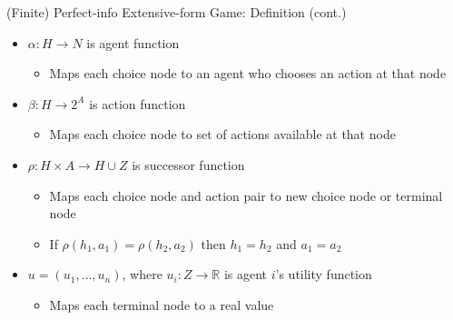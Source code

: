\documentclass[11pt,aspectratio=169,handout]{beamer}
\begin{document}
  
  \begin{frame}{(Finite) Perfect-info Extensive-form Game: Definition (cont.)}
   \begin{itemize}[<+->]
   \setlength{\itemsep}{1em}
    \item $\alpha : H \rightarrow N$ is \alert{agent function}
    \begin{itemize}[<.->]
     \item Maps each choice node to an agent who chooses an action at that node
    \end{itemize}
    \item $\beta : H \rightarrow 2^{A}$ is \alert{action function}
    \begin{itemize}[<.->]
     \item Maps each choice node to set of actions available at that node
    \end{itemize}
    \item $\rho: H \times A \rightarrow H \cup Z$ is \alert{successor function}
    \begin{itemize}[<.->]
     \item Maps each choice node and action pair to new choice node or terminal node
     \item If $\rho(h_1, a_1) = \rho(h_2, a_2)$ then $h_1 = h_2$ and $a_1 = a_2$
    \end{itemize}
    \item $u = (u_1, \dots, u_n)$, where $u_i: Z \rightarrow \mathbb{R}$ is agent $i$'s \alert{utility function}
    \begin{itemize}[<.->]
     \item Maps each terminal node to a real value
    \end{itemize}
   \end{itemize}
  \end{frame} 
  
\end{document}
